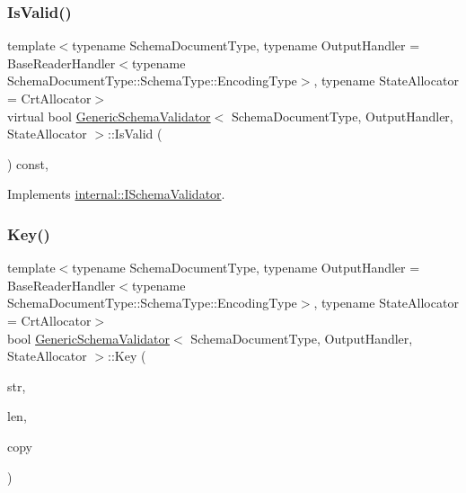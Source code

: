 \mbox{\label{classGenericSchemaValidator_a8ebda4da3d8b1fc41e57f15dd62e8f19}} 
\subsubsection{\texorpdfstring{Is\+Valid()}{IsValid()}}
{\footnotesize\ttfamily template$<$typename Schema\+Document\+Type, typename Output\+Handler = Base\+Reader\+Handler$<$typename Schema\+Document\+Type\+::\+Schema\+Type\+::\+Encoding\+Type$>$, typename State\+Allocator = Crt\+Allocator$>$ \\
virtual bool \hyperlink{classGenericSchemaValidator}{Generic\+Schema\+Validator}$<$ Schema\+Document\+Type, Output\+Handler, State\+Allocator $>$\+::Is\+Valid (\begin{DoxyParamCaption}{ }\end{DoxyParamCaption}) const\hspace{0.3cm}{\ttfamily [inline]}, {\ttfamily [virtual]}}



Implements \hyperlink{classinternal_1_1ISchemaValidator_a94f61f24b1447497279ef12ee0127285}{internal\+::\+I\+Schema\+Validator}.

\mbox{\label{classGenericSchemaValidator_a6d08b458216ec4a09eed9d94800d05c1}} 
\subsubsection{\texorpdfstring{Key()}{Key()}}
{\footnotesize\ttfamily template$<$typename Schema\+Document\+Type, typename Output\+Handler = Base\+Reader\+Handler$<$typename Schema\+Document\+Type\+::\+Schema\+Type\+::\+Encoding\+Type$>$, typename State\+Allocator = Crt\+Allocator$>$ \\
bool \hyperlink{classGenericSchemaValidator}{Generic\+Schema\+Validator}$<$ Schema\+Document\+Type, Output\+Handler, State\+Allocator $>$\+::Key (\begin{DoxyParamCaption}\item[{const \hyperlink{classGenericSchemaValidator_a8b7dab5a0cda9cc0adaefb4401d260c1}{Ch} $\ast$}]{str,  }\item[{\hyperlink{rapidjson_8h_a5ed6e6e67250fadbd041127e6386dcb5}{Size\+Type}}]{len,  }\item[{bool}]{copy }\end{DoxyParamCaption})\hspace{0.3cm}{\ttfamily [inline]}}

